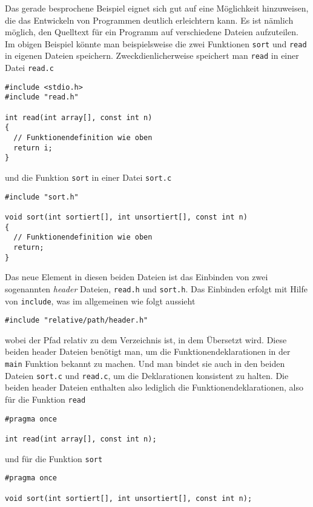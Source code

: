 Das gerade besprochene Beispiel eignet sich gut auf eine Möglichkeit hinzuweisen, die das Entwickeln von Programmen deutlich erleichtern kann.
Es ist nämlich möglich, den Quelltext für ein Programm auf verschiedene Dateien aufzuteilen.
Im obigen Beispiel könnte man beispielsweise die zwei Funktionen \texttt{sort} und \texttt{read} in eigenen Dateien speichern. 
Zweckdienlicherweise speichert man \texttt{read} in einer Datei \texttt{read.c}
\begin{lstlisting}[caption={Datei \texttt{read.c}}, belowcaptionskip=0.3em]
#include <stdio.h>
#include "read.h"
  
int read(int array[], const int n)
{
  // Funktionendefinition wie oben
  return i;
}
\end{lstlisting}
und die Funktion \texttt{sort} in einer Datei \texttt{sort.c}
\begin{lstlisting}[caption={Datei \texttt{sort.c}}, belowcaptionskip=0.3em]
#include "sort.h"
  
void sort(int sortiert[], int unsortiert[], const int n)
{
  // Funktionendefinition wie oben
  return;
}
\end{lstlisting}
Das neue Element in diesen beiden Dateien ist das Einbinden von zwei sogenannten \emph{header} Dateien, \texttt{read.h} und \texttt{sort.h}.
Das Einbinden erfolgt mit Hilfe von \texttt{include}, was im allgemeinen wie folgt aussieht
\begin{lstlisting}
#include "relative/path/header.h"
\end{lstlisting}
wobei der Pfad relativ zu dem Verzeichnis ist, in dem Übersetzt wird.
Diese beiden header Dateien benötigt man, um die Funktionendeklarationen in der \texttt{main} Funktion bekannt zu machen.
Und man bindet sie auch in den beiden Dateien \texttt{sort.c} und \texttt{read.c}, um die Deklarationen konsistent zu halten.
Die beiden header Dateien enthalten also lediglich die Funktionendeklarationen, also für die Funktion \texttt{read}
\begin{lstlisting}[caption={Datei \texttt{read.h}}, belowcaptionskip=0.3em]
#pragma once
  
int read(int array[], const int n);
\end{lstlisting}
und für die Funktion \texttt{sort}
\begin{lstlisting}[caption={Datei \texttt{sort.h}}, belowcaptionskip=0.3em]
#pragma once
  
void sort(int sortiert[], int unsortiert[], const int n);
\end{lstlisting}
